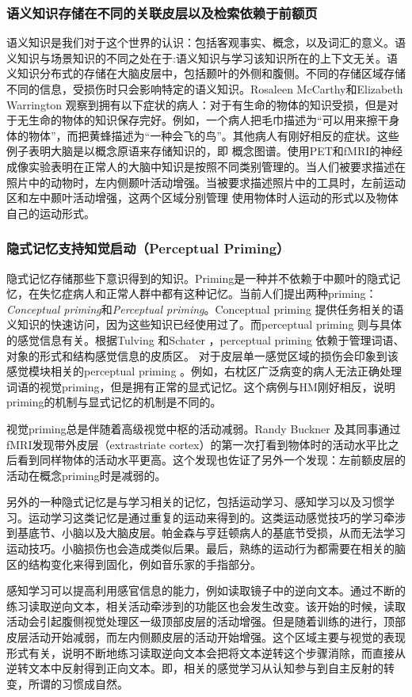 \documentclass[UTF8,nofonts]{ctexart}
\begin{document}
\subsubsection{语义知识存储在不同的关联皮层以及检索依赖于前额页}
语义知识是我们对于这个世界的认识：包括客观事实、概念，以及词汇的意义。语义知识与场景知识的不同之处在于:语义知识与学习该知识所在的上下文无关。语义知识分布式的存储在大脑皮层中，包括颞叶的外侧和腹侧。不同的存储区域存储不同的信息，受损伤时只会影响特定的语义知识。Rosaleen McCarthy和Elizabeth Warrington 观察到拥有以下症状的病人：对于有生命的物体的知识受损，但是对于无生命的物体的知识保存完好。例如，一个病人把毛巾描述为“可以用来擦干身体的物体”，而把黄蜂描述为“一种会飞的鸟”。其他病人有刚好相反的症状。这些例子表明大脑是以概念原语来存储知识的，即 概念图谱。使用PET和fMRI的神经成像实验表明在正常人的大脑中知识是按照不同类别管理的。当人们被要求描述在照片中的动物时，左内侧颞叶活动增强。当被要求描述照片中的工具时，左前运动区和左中颞叶活动增强，这两个区域分别管理
使用物体时人运动的形式以及物体自己的运动形式。
\subsubsection{隐式记忆支持知觉启动（Perceptual Priming）}
隐式记忆存储那些下意识得到的知识。Priming是一种并不依赖于中颞叶的隐式记忆，在失忆症病人和正常人群中都有这种记忆。当前人们提出两种priming：\textit{Conceptual priming}和\textit{Perceptual priming}。Conceptual priming 提供任务相关的语义知识的快速访问，因为这些知识已经使用过了。而perceptual priming 则与具体的感觉信息有关。根据Tulving 和Schater ，perceptual priming 依赖于管理词语、对象的形式和结构感觉信息的皮质区。
对于皮层单一感觉区域的损伤会印象到该感觉模块相关的perceptual priming 。例如，右枕区广泛病变的病人无法正确处理词语的视觉priming，但是拥有正常的显式记忆。这个病例与HM刚好相反，说明priming的机制与显式记忆的机制是不同的。
\par
视觉priming总是伴随着高级视觉中枢的活动减弱。Randy Buckner 及其同事通过fMRI发现带外皮层（extrastriate cortex）的第一次打看到物体时的活动水平比之后看到同样物体的活动水平更高。这个发现也佐证了另外一个发现：左前额皮层的活动在概念priming时是减弱的。
\par
另外的一种隐式记忆是与学习相关的记忆，包括运动学习、感知学习以及习惯学习。运动学习这类记忆是通过重复的运动来得到的。这类运动感觉技巧的学习牵涉到基底节、小脑以及大脑皮层。帕金森与亨廷顿病人的基底节受损，从而无法学习运动技巧。小脑损伤也会造成类似后果。最后，熟练的运动行为都需要在相关的脑区的结构变化来得到固化，例如音乐家的手指部分。
\par
感知学习可以提高利用感官信息的能力，例如读取镜子中的逆向文本。通过不断的练习读取逆向文本，相关活动牵涉到的功能区也会发生改变。该开始的时候，读取活动会引起腹侧视觉处理区一级顶部皮层的活动增强。但是随着训练的进行，顶部皮层活动开始减弱，而左内侧颞皮层的活动开始增强。这个区域主要与视觉的表现形式有关，说明不断地练习读取逆向文本会把将文本逆转这个步骤消除，而直接从逆转文本中反射得到正向文本。即，相关的感觉学习从认知参与到自主反射的转变，所谓的习惯成自然。
\end{document}

